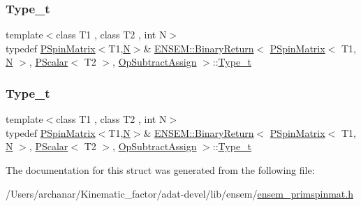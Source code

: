 \subsubsection{\texorpdfstring{Type\_t}{Type\_t}\hspace{0.1cm}{\footnotesize\ttfamily [2/3]}}
{\footnotesize\ttfamily template$<$class T1 , class T2 , int N$>$ \\
typedef \mbox{\hyperlink{classENSEM_1_1PSpinMatrix}{P\+Spin\+Matrix}}$<$T1,\mbox{\hyperlink{adat__devel_2lib_2hadron_2operator__name__util_8cc_a7722c8ecbb62d99aee7ce68b1752f337}{N}}$>$\& \mbox{\hyperlink{structENSEM_1_1BinaryReturn}{E\+N\+S\+E\+M\+::\+Binary\+Return}}$<$ \mbox{\hyperlink{classENSEM_1_1PSpinMatrix}{P\+Spin\+Matrix}}$<$ T1, \mbox{\hyperlink{adat__devel_2lib_2hadron_2operator__name__util_8cc_a7722c8ecbb62d99aee7ce68b1752f337}{N}} $>$, \mbox{\hyperlink{classENSEM_1_1PScalar}{P\+Scalar}}$<$ T2 $>$, \mbox{\hyperlink{structENSEM_1_1OpSubtractAssign}{Op\+Subtract\+Assign}} $>$\+::\mbox{\hyperlink{structENSEM_1_1BinaryReturn_3_01PSpinMatrix_3_01T1_00_01N_01_4_00_01PScalar_3_01T2_01_4_00_01OpSubtractAssign_01_4_add7bea3a5ec6001788d9783d5b22348a}{Type\+\_\+t}}}

\mbox{\label{structENSEM_1_1BinaryReturn_3_01PSpinMatrix_3_01T1_00_01N_01_4_00_01PScalar_3_01T2_01_4_00_01OpSubtractAssign_01_4_add7bea3a5ec6001788d9783d5b22348a}} 
\subsubsection{\texorpdfstring{Type\_t}{Type\_t}\hspace{0.1cm}{\footnotesize\ttfamily [3/3]}}
{\footnotesize\ttfamily template$<$class T1 , class T2 , int N$>$ \\
typedef \mbox{\hyperlink{classENSEM_1_1PSpinMatrix}{P\+Spin\+Matrix}}$<$T1,\mbox{\hyperlink{adat__devel_2lib_2hadron_2operator__name__util_8cc_a7722c8ecbb62d99aee7ce68b1752f337}{N}}$>$\& \mbox{\hyperlink{structENSEM_1_1BinaryReturn}{E\+N\+S\+E\+M\+::\+Binary\+Return}}$<$ \mbox{\hyperlink{classENSEM_1_1PSpinMatrix}{P\+Spin\+Matrix}}$<$ T1, \mbox{\hyperlink{adat__devel_2lib_2hadron_2operator__name__util_8cc_a7722c8ecbb62d99aee7ce68b1752f337}{N}} $>$, \mbox{\hyperlink{classENSEM_1_1PScalar}{P\+Scalar}}$<$ T2 $>$, \mbox{\hyperlink{structENSEM_1_1OpSubtractAssign}{Op\+Subtract\+Assign}} $>$\+::\mbox{\hyperlink{structENSEM_1_1BinaryReturn_3_01PSpinMatrix_3_01T1_00_01N_01_4_00_01PScalar_3_01T2_01_4_00_01OpSubtractAssign_01_4_add7bea3a5ec6001788d9783d5b22348a}{Type\+\_\+t}}}



The documentation for this struct was generated from the following file\+:\begin{DoxyCompactItemize}
\item 
/\+Users/archanar/\+Kinematic\+\_\+factor/adat-\/devel/lib/ensem/\mbox{\hyperlink{adat-devel_2lib_2ensem_2ensem__primspinmat_8h}{ensem\+\_\+primspinmat.\+h}}\end{DoxyCompactItemize}
